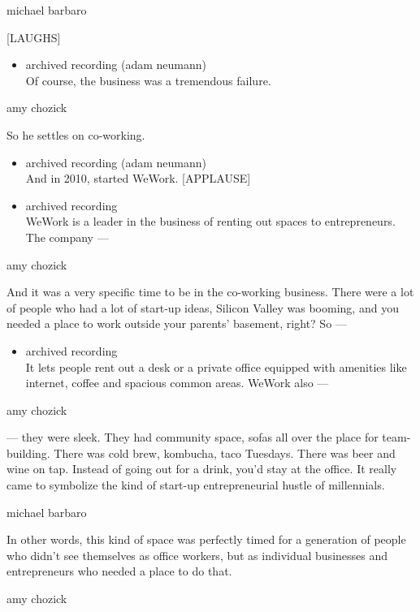 michael barbaro

{[}LAUGHS{]}

\begin{itemize}
\tightlist
\item
  archived recording (adam neumann)\\
  Of course, the business was a tremendous failure.
\end{itemize}

amy chozick

So he settles on co-working.

\begin{itemize}
\item
  archived recording (adam neumann)\\
  And in 2010, started WeWork. {[}APPLAUSE{]}
\item
  archived recording\\
  WeWork is a leader in the business of renting out spaces to
  entrepreneurs. The company ---
\end{itemize}

amy chozick

And it was a very specific time to be in the co-working business. There
were a lot of people who had a lot of start-up ideas, Silicon Valley was
booming, and you needed a place to work outside your parents' basement,
right? So ---

\begin{itemize}
\tightlist
\item
  archived recording\\
  It lets people rent out a desk or a private office equipped with
  amenities like internet, coffee and spacious common areas. WeWork also
  ---
\end{itemize}

amy chozick

--- they were sleek. They had community space, sofas all over the place
for team-building. There was cold brew, kombucha, taco Tuesdays. There
was beer and wine on tap. Instead of going out for a drink, you'd stay
at the office. It really came to symbolize the kind of start-up
entrepreneurial hustle of millennials.

michael barbaro

In other words, this kind of space was perfectly timed for a generation
of people who didn't see themselves as office workers, but as individual
businesses and entrepreneurs who needed a place to do that.

amy chozick


